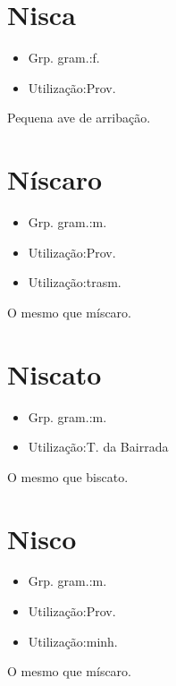 \section{Nisca}
\begin{itemize}
\item {Grp. gram.:f.}
\end{itemize}
\begin{itemize}
\item {Utilização:Prov.}
\end{itemize}
Pequena ave de arribação.
\section{Níscaro}
\begin{itemize}
\item {Grp. gram.:m.}
\end{itemize}
\begin{itemize}
\item {Utilização:Prov.}
\end{itemize}
\begin{itemize}
\item {Utilização:trasm.}
\end{itemize}
O mesmo que \textunderscore míscaro\textunderscore .
\section{Niscato}
\begin{itemize}
\item {Grp. gram.:m.}
\end{itemize}
\begin{itemize}
\item {Utilização:T. da Bairrada}
\end{itemize}
O mesmo que \textunderscore biscato\textunderscore .
\section{Nisco}
\begin{itemize}
\item {Grp. gram.:m.}
\end{itemize}
\begin{itemize}
\item {Utilização:Prov.}
\end{itemize}
\begin{itemize}
\item {Utilização:minh.}
\end{itemize}
O mesmo que \textunderscore míscaro\textunderscore .
